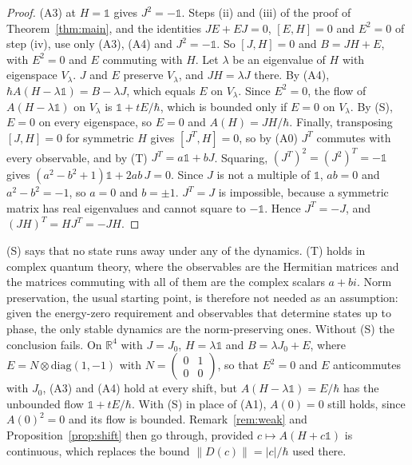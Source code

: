 \documentclass[11pt]{article}
\theoremstyle{remark}
\newcommand{\R}{\mathbb{R}}
\newcommand{\one}{\mathbb{1}}
\begin{document}
\begin{proof}
(A3) at $H=\one$ gives $J^2=-\one$. Steps (ii) and (iii) of the proof of Theorem~\ref{thm:main}, and the identities $JE+EJ=0$, $[E,H]=0$ and $E^2=0$ of step (iv), use only (A3), (A4) and $J^2=-\one$. So $[J,H]=0$ and $B=JH+E$, with $E^2=0$ and $E$ commuting with $H$. Let $\lambda$ be an eigenvalue of $H$ with eigenspace $V_\lambda$. $J$ and $E$ preserve $V_\lambda$, and $JH=\lambda J$ there. By (A4), $\hbar A(H-\lambda\one)=B-\lambda J$, which equals $E$ on $V_\lambda$. Since $E^2=0$, the flow of $A(H-\lambda\one)$ on $V_\lambda$ is $\one+tE/\hbar$, which is bounded only if $E=0$ on $V_\lambda$. By (S), $E=0$ on every eigenspace, so $E=0$ and $A(H)=JH/\hbar$. Finally, transposing $[J,H]=0$ for symmetric $H$ gives $[J^T,H]=0$, so by (A0) $J^T$ commutes with every observable, and by (T) $J^T=a\one+bJ$. Squaring, $(J^T)^2=(J^2)^T=-\one$ gives $(a^2-b^2+1)\one+2ab\,J=0$. Since $J$ is not a multiple of $\one$, $ab=0$ and $a^2-b^2=-1$, so $a=0$ and $b=\pm1$. $J^T=J$ is impossible, because a symmetric matrix has real eigenvalues and cannot square to $-\one$. Hence $J^T=-J$, and $(JH)^T=HJ^T=-JH$.
\end{proof}

(S) says that no state runs away under any of the dynamics. (T) holds in complex quantum theory, where the observables are the Hermitian matrices and the matrices commuting with all of them are the complex scalars $a+bi$. Norm preservation, the usual starting point, is therefore not needed as an assumption: given the energy-zero requirement and observables that determine states up to phase, the only stable dynamics are the norm-preserving ones. Without (S) the conclusion fails. On $\R^4$ with $J=J_0$, $H=\lambda\one$ and $B=\lambda J_0+E$, where $E=N\otimes\mathrm{diag}(1,-1)$ with $N=\left(\begin{smallmatrix}0&1\\0&0\end{smallmatrix}\right)$, so that $E^2=0$ and $E$ anticommutes with $J_0$, (A3) and (A4) hold at every shift, but $A(H-\lambda\one)=E/\hbar$ has the unbounded flow $\one+tE/\hbar$. With (S) in place of (A1), $A(0)=0$ still holds, since $A(0)^2=0$ and its flow is bounded. Remark~\ref{rem:weak} and Proposition~\ref{prop:shift} then go through, provided $c\mapsto A(H+c\one)$ is continuous, which replaces the bound $\|D(c)\|=|c|/\hbar$ used there.
\end{document}
